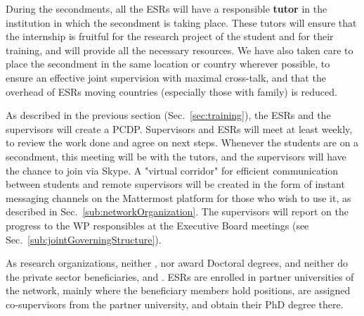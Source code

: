 During the secondments, all the ESRs will have a responsible \textbf{tutor} in the institution in which the secondment is taking place. These tutors will ensure that the internship is fruitful for the research project of the student and for their training, and will provide all the necessary
resources. 
We have also taken care to place the secondment in the same location or country wherever possible, to ensure an effective joint supervision 
with maximal cross-talk, and that the overhead of ESRs moving countries (especially those with family) is reduced. 

As described in the previous section (Sec.~\ref{sec:training}), the ESRs and the supervisors will create a PCDP. 
Supervisors and ESRs will meet at least weekly, to review the work done and agree on next steps. 
Whenever the students are on a secondment, this meeting will be with the tutors, and the supervisors will have the chance to join via Skype. 
A "virtual corridor" for efficient communication between students and remote supervisors will be created in the form of instant messaging channels on the Mattermost platform for those who wish to use it, as described in Sec.~\ref{sub:networkOrganization}. 
The supervisors will report on the progress to the WP responsibles at the Executive Board meetings (see Sec.~\ref{sub:jointGoverningStructure}). 

As research organizations, neither \cernentity, nor \nikhefentity award Doctoral degrees, and neither do the private sector beneficiaries, \dqentity and \ibmentity. ESRs are enrolled in partner universities of the network, mainly where the beneficiary members hold positions, are assigned co-supervisors from the partner university, and obtain their PhD degree there. 




